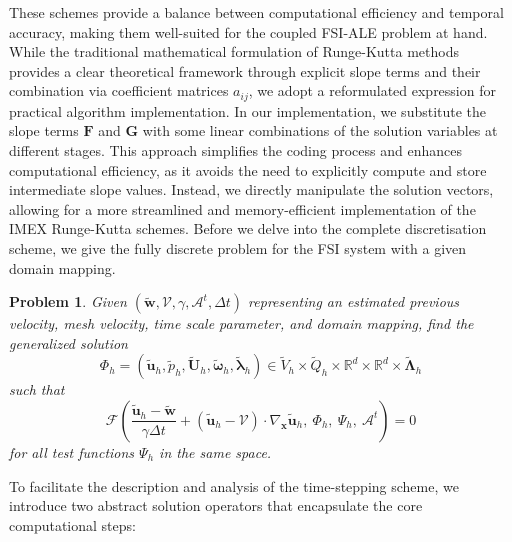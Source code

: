 \documentclass{article}
\newcommand{\bU}{{\mathbf{U}}}
\newcommand{\bx}{{\mathbf{x}}}
\newcommand\tu{{\tilde{\mathbf{u}}}}
\newcommand\tp{{\tilde{{p}}}}
\newtheorem{problem}{Problem}
\begin{document}
These schemes provide a balance between computational efficiency and temporal accuracy, making them well-suited for the coupled FSI-ALE problem at hand. While the traditional mathematical formulation of Runge-Kutta methods provides a clear theoretical framework through explicit slope terms and their combination via coefficient matrices $a_{ij}$, we adopt a reformulated expression for practical algorithm implementation. In our implementation, we substitute the slope terms $\mathbf{F}$ and $\mathbf{G}$ with some linear combinations of the solution variables at different stages. This approach simplifies the coding process and enhances computational efficiency, as it avoids the need to explicitly compute and store intermediate slope values. Instead, we directly manipulate the solution vectors, allowing for a more streamlined and memory-efficient implementation of the IMEX Runge-Kutta schemes.
Before we delve into the complete discretisation scheme, we give the fully discrete problem for the FSI system with a given domain mapping.
\begin{problem}\label{problem:general_IMEX}
Given $(\tilde{\mathbf{w}}, \mathcal{V}, \gamma, \mathcal{A}^t, \Delta t)$ representing an estimated previous velocity, mesh velocity, time scale parameter, and domain mapping, find the generalized solution
\[
{\Phi}_h =  (\tu_h, \tp_h, \tilde{\bU}_h, \tilde{\boldsymbol{\omega}}_h, \tilde{\boldsymbol{\lambda}}_h)  \in \tilde{V}_h \times \tilde{Q}_h \times \mathbb{R}^d \times \mathbb{R}^d \times \tilde{\boldsymbol{\Lambda}}_h
\]
such that
\begin{equation}\label{eq:general_IMEX}
\mathcal{F}\left( 
\frac{\tu_h - \tilde{\mathbf{w}}}{\gamma \Delta t} + (\tu_h - \mathcal{V}) \cdot \nabla_{\bx} \tu_h,\ 
{\Phi}_h,\ 
{\Psi}_h,\ 
\mathcal{A}^t 
\right) = 0
\end{equation}
for all test functions ${\Psi}_h$ in the same space.
\end{problem}

To facilitate the description and analysis of the time-stepping scheme, we introduce two abstract solution operators that encapsulate the core computational steps:
\end{document}
